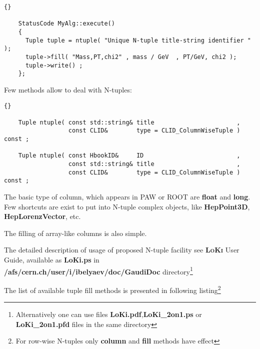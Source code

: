 \documentclass{lhcbnote}
\newcommand{\bftt}         {\ttfamily\bfseries}
\newcommand{\scbf}         {\scshape\bfseries}
\begin{document}
\begin{scriptsize}
  \begin{lstlisting}{}

    StatusCode MyAlg::execute()
    {
      Tuple tuple = ntuple( "Unique N-tuple title-string identifier " );
      tuple->fill( "Mass,PT,chi2" , mass / GeV  , PT/GeV, chi2 );
      tuple->write() ;
    }; 

  \end{lstlisting}
\end{scriptsize}
Few methods allow to deal with N-tuples:

\begin{scriptsize}
  \begin{lstlisting}{}

    Tuple ntuple( const std::string& title                       , 
                  const CLID&        type = CLID_ColumnWiseTuple ) const ;

    Tuple ntuple( const HbookID&     ID                          , 
                  const std::string& title                       , 
                  const CLID&        type = CLID_ColumnWiseTuple ) const ;

  \end{lstlisting}
\end{scriptsize}

The basic type of column, which appears in PAW or ROOT 
are {\bftt{float}} and {\bftt{long}}. Few shortcuts are exist 
to put into N-tuple complex objects, like {\bftt{HepPoint3D}}, 
{\bftt{HepLorenzVector}}, etc.

The filling of array-like columns is also simple.

The detailed description of usage of proposed N-tuple facility see
{\scbf{LoKi}} User Guide, available as 
{\bftt{LoKi.ps}} in 
{\bftt{/afs/cern.ch/user/i/ibelyaev/doc/GaudiDoc}} directory\footnote{
Alternatively one can use files {\bftt{LoKi.pdf}},{\bftt{LoKi\_2on1.ps}}
or {\bftt{LoKi\_2on1.pfd}} files in the same directory}

The list of available tuple fill methods  
is presented in following listing\footnote{For 
row-wise N-tuples only {\bftt{column}} and 
{\bftt{fill}} methods have effect}
\end{document}
